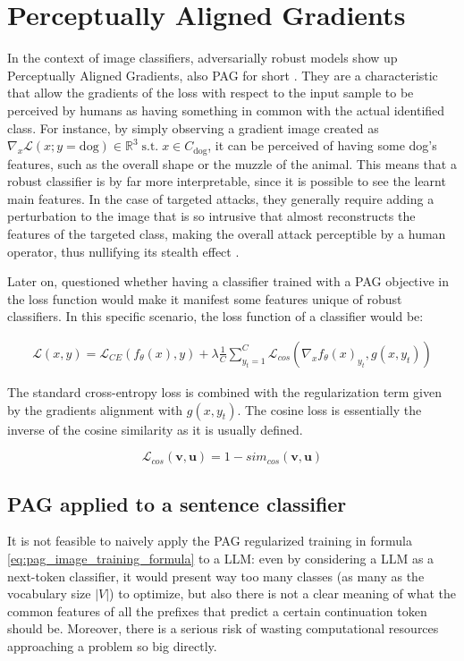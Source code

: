 \documentclass[../thesis.tex]{subfiles}
\begin{document}
\chapter{Perceptually Aligned Gradients}
In the context of image classifiers, adversarially robust models show up Perceptually Aligned Gradients, also PAG for short \citep{engstrom2019adversarialpag} \citep{Ross_Doshi-Velez_2018_pag}.
They are a characteristic that allow the gradients of the loss with respect to the input sample to be perceived by humans as having something in common with the actual identified class.
For instance, by simply observing a gradient image created as
$\nabla_x \mathcal{L}(x; y = \text{dog}) \in \mathbb{R}^3 \;\text{s.t.}\; x \in C_{\text{dog}} $,
it can be perceived of having some dog's features, such as the overall shape or the muzzle of the animal.
This means that a robust classifier is by far more interpretable, since it is possible to see the learnt main features.
In the case of targeted attacks, they generally require adding a perturbation to the image that is so intrusive that almost reconstructs the features of the targeted class, making the overall attack perceptible by a human operator, thus nullifying its stealth effect \citep{aggarwal2020benefitspag}.

Later on, \citeauthor{pag-imply-robustness} questioned whether having a classifier trained with a PAG objective in the loss function would make it manifest some features unique of robust classifiers.
In this specific scenario, the loss function of a classifier would be:

\begin{equation}
\label{eq:pag_image_training_formula}
\begin{split}
\mathcal{L}(x, y) = \mathcal{L}_{CE}( f_\theta(x), y)
                + \lambda \frac{1}{C} \sum_{y_t=1}^C \mathcal{L}_{cos}(\nabla_x f_\theta(x)_{y_t}, g(x, y_t))
\end{split}
\end{equation}

The standard cross-entropy loss is combined with the regularization term given by the gradients alignment with $g(x, y_t)$.
The cosine loss is essentially the inverse of the cosine similarity as it is usually defined.

\begin{equation}
\mathcal{L}_{cos}(\mathbf{v}, \mathbf{u}) = 1 - sim_{cos}(\mathbf{v}, \mathbf{u})
\end{equation}

\section{PAG applied to a sentence classifier}
It is not feasible to naively apply the PAG regularized training in formula \cref{eq:pag_image_training_formula} to a LLM:
even by considering a LLM as a next-token classifier, it would present way too many classes (as many as the vocabulary size $|V|$) to optimize, but also there is not a clear meaning of what the common features of all the prefixes that predict a certain continuation token should be.
Moreover, there is a serious risk of wasting computational resources approaching a problem so big directly.
\end{document}
